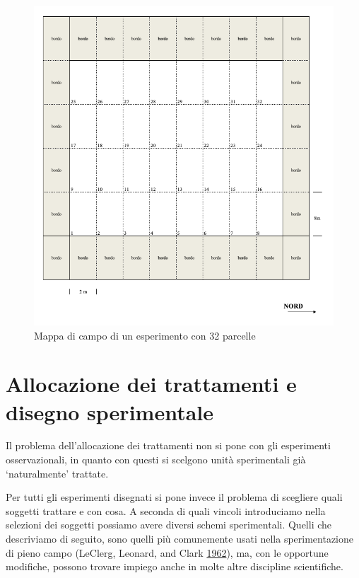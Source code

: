 \documentclass[a4paper,12pt,oneside]{book}
\theoremstyle{definition}
\theoremstyle{definition}
\theoremstyle{definition}
\theoremstyle{remark}
\begin{document}
\begin{figure}

{\centering \includegraphics[width=0.9\linewidth]{_images/Mappa1} 

}

\caption{Mappa di campo di un esperimento con 32 parcelle}\label{fig:figName31}
\end{figure}

\section{Allocazione dei trattamenti e disegno
sperimentale}\label{allocazione-dei-trattamenti-e-disegno-sperimentale}

Il problema dell'allocazione dei trattamenti non si pone con gli
esperimenti osservazionali, in quanto con questi si scelgono unità
sperimentali già `naturalmente' trattate.

Per tutti gli esperimenti disegnati si pone invece il problema di
scegliere quali soggetti trattare e con cosa. A seconda di quali vincoli
introduciamo nella selezioni dei soggetti possiamo avere diversi schemi
sperimentali. Quelli che descriviamo di seguito, sono quelli più
comunemente usati nella sperimentazione di pieno campo (LeClerg,
Leonard, and Clark
\protect\hyperlink{ref-leclerg1962_FieldPlotTechnique}{1962}), ma, con
le opportune modifiche, possono trovare impiego anche in molte altre
discipline scientifiche.
\end{document}
